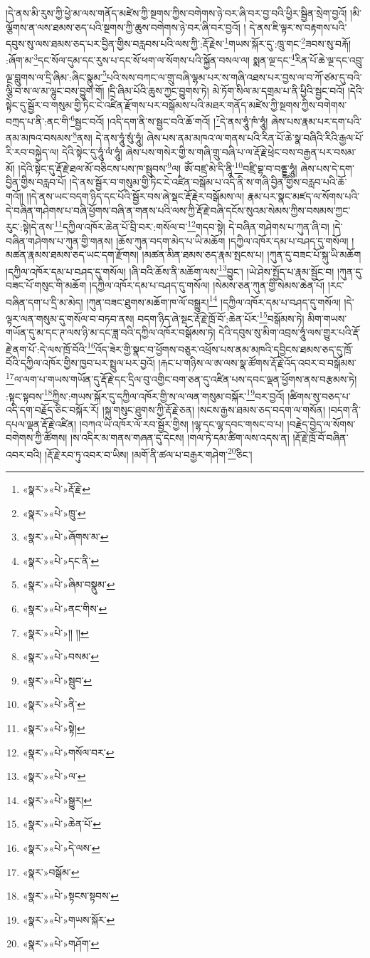 །དེ་ནས་མི་རུས་ཀྱི་ཕྱེ་མ་ལས་གནོད་མཛེས་ཀྱི་སྔགས་ཀྱིས་བགེགས་ཉེ་བར་ཞི་བར་བྱ་བའི་ཕྱིར་སྦྱིན་སྲེག་བྱའོ། །མི་ལྕོགས་ན་ལས་ཐམས་ཅད་པའི་སྔགས་ཀྱི་ཆུས་བགེགས་ཉེ་བར་ཞི་བར་བྱའོ། །
དེ་ནས་ཇི་ལྟར་ས་བརྟགས་པའི་དབུས་སུ་ལས་ཐམས་ཅད་པར་བྱིན་གྱིས་བརླབས་པའི་ལས་ཀྱི་:རྡོ་རྗེས་\footnote{«སྣར་»«པེ་»རྡོ་རྗེ་}གཡས་སྐོར་དུ་:ཁྲུ་གང་\footnote{«སྣར་»«པེ་»ཁྲུ་}ཟབས་སུ་བརྐོ། :ཞོག་མ་\footnote{«སྣར་»«པེ་»ཞོགས་མ་}དང་སོལ་དུམ་དང་རུས་པ་དང་སོ་ཕག་ལ་སོགས་པའི་སྐྱོན་བསལ་ལ། སྨན་ལྔ་དང་\footnote{«སྣར་»«པེ་»དང་ནི་}རིན་པོ་ཆེ་ལྔ་དང་འབྲུ་ལྔ་བླུགས་ལ་དྲི་ཞིམ་:ཞིང་སྣུམ་\footnote{«སྣར་»«པེ་»ཞིམ་བསྣུམ་}པའི་སས་བཀང་ལ་གྲུ་བཞི་ལྷམ་པར་ས་གཞི་འཐས་པར་བྱས་ལ་བ་ཀོ་ཙམ་དུ་བའི་ལྕི་བ་ས་ལ་མ་ལྷུང་བས་བྱུག་གོ། །དྲི་ཞིམ་པོའི་ཆུས་ཀྱང་བྱུགས་ཏེ། མེ་ཏོག་སིལ་མ་དགྲམ་པ་ནི་ཕྱིའི་སྦྱང་བའོ། །དེའི་སྟེང་དུ་སྦྱོར་བ་གསུམ་གྱི་ཏིང་ངེ་འཛིན་རྫོགས་པར་བསྒོམས་པའི་མཐར་གནོད་མཛེས་ཀྱི་སྔགས་ཀྱིས་བགེགས་བཀྲད་པ་ནི་:ནང་གི་\footnote{«སྣར་»«པེ་»ནང་གིས་}སྦྱང་བའོ། །འདི་དག་ནི་ས་སྦྱང་བའི་ཆོ་གའོ། །\footnote{«སྣར་»«པེ་»།། །།}དེ་ནས་ཧཱུཾ་ཁཾ་ཧཱུཾ། ཞེས་པས་རྣམ་པར་དག་པའི་ནམ་མཁའ་བསམས་\footnote{«སྣར་»«པེ་»བསམ་}ནས། དེ་ནས་ཧཱུཾ་སུཾ་ཧཱུཾ། ཞེས་པས་ནམ་མཁའ་ལ་གནས་པའི་རིན་པོ་ཆེ་སྣ་བཞིའི་རིའི་རྒྱལ་པོ་རི་རབ་བསྐྱེད་ལ། དེའི་སྟེང་དུ་ཧཱུཾ་ལཾ་ཧཱུཾ། ཞེས་པས་གསེར་གྱི་ས་གཞི་གྲུ་བཞི་པ་ལ་རྡོ་རྗེ་ཕྲེང་བས་བརྒྱན་པར་བསམ་མོ། །དེའི་སྟེང་དུ་རྡོ་རྗེ་ཐལ་མོ་བཅིངས་པས་ཁ་སྦུབས་\footnote{«སྣར་»«པེ་»སྦུབ་}ལ། ཨོཾ་བཛྲ་མེ་དི་ནཱི་\footnote{«སྣར་»«པེ་»ནི་}བཛྲི་བྷ་བ་བནྡྷ་ཧཱུཾ། ཞེས་པས་དེ་དག་བྱིན་གྱིས་བརླབ་པོ། །དེ་ནས་སྦྱོར་བ་གསུམ་གྱི་ཏིང་ངེ་འཛིན་བསྒོམ་པ་འདི་ནི་ས་གཞི་བྱིན་གྱིས་བརླབ་པའི་ཆོ་གའོ།། །།དེ་ནས་ཡང་བདག་ཉིད་དང་པོའི་སྦྱོར་བས་ཞེ་སྡང་རྡོ་རྗེར་བསྒོམས་ལ། རྣམ་པར་སྣང་མཛད་ལ་སོགས་པའི་དེ་བཞིན་གཤེགས་པ་བཞི་ཕྱོགས་བཞི་ན་གནས་པའི་ལས་ཀྱི་རྡོ་རྗེ་བཞི་དངོས་སུའམ་སེམས་ཀྱིས་བསམས་ཀྱང་རུང་:སྟེ།དེ་ནས་\footnote{«སྣར་»«པེ་»སྟེ།}དཀྱིལ་འཁོར་ཆེན་པོ་བྲི་བར་:གསོལ་བ་\footnote{«སྣར་»«པེ་»གསོལ་བར་}གདབ་སྟེ། དེ་བཞིན་གཤེགས་པ་ཀུན་ཞི་བ། །དེ་བཞིན་གཤེགས་པ་ཀུན་གྱི་གནས། །ཆོས་ཀུན་བདག་མེད་པ་ཡི་མཆོག །དཀྱིལ་འཁོར་དམ་པ་བཤད་དུ་གསོལ། །མཚན་རྣམས་ཐམས་ཅད་ཡང་དག་རྫོགས། །མཚན་མིན་ཐམས་ཅད་རྣམ་སྤངས་པ། །ཀུན་དུ་བཟང་པོ་སྐུ་ཡི་མཆོག །དཀྱིལ་འཁོར་དམ་པ་བཤད་དུ་གསོལ། །ཞི་བའི་ཆོས་ནི་མཆོག་ལས་\footnote{«སྣར་»«པེ་»ལ་}བྱུང་། །ཡེ་ཤེས་སྤྱོད་པ་རྣམ་སྦྱོང་བ། །ཀུན་དུ་བཟང་པོ་གསུང་གི་མཆོག །དཀྱིལ་འཁོར་དམ་པ་བཤད་དུ་གསོལ། །སེམས་ཅན་ཀུན་གྱི་སེམས་ཆེན་པོ། །རང་བཞིན་དག་པ་དྲི་མ་མེད། །ཀུན་བཟང་ཐུགས་མཆོག་ཁ་ལོ་བསྒྱུར།\footnote{«སྣར་»«པེ་»སྒྱུར།} །དཀྱིལ་འཁོར་དམ་པ་བཤད་དུ་གསོལ། །དེ་ལྟར་ལན་གསུམ་དུ་གསོལ་བ་བཏབ་ནས། བདག་ཉིད་ཞེ་སྡང་རྡོ་རྗེ་ཁྲོ་བོ་:ཆེན་པོར་\footnote{«སྣར་»«པེ་»ཆེན་པོ་}བསྒོམས་ཏེ། མིག་གཡས་གཡོན་དུ་མ་དང་ཊ་ལས་ཉི་མ་དང་ཟླ་བའི་དཀྱིལ་འཁོར་བསྒོམས་ཏེ། དེའི་དབུས་སུ་མིག་འབྲས་ཧཱུཾ་ལས་གྱུར་པའི་རྡོ་རྗེ་ནག་པོ་:དེ་ལས་ཁྲོ་བོའི་\footnote{«སྣར་»«པེ་»དེ་ལས་}འོད་ཟེར་གྱི་སྣང་བ་ཕྱོགས་བཅུར་འཕྲོས་པས་ནམ་མཁའི་དབྱིངས་ཐམས་ཅད་དུ་ཁྲོ་བོའི་དཀྱིལ་འཁོར་གྱིས་ཁྱབ་པར་སྤྲུལ་པར་བྱའོ། །རྐང་པ་གཉིས་ལ་ཨ་ལས་སྣ་ཚོགས་རྡོ་རྗེ་འོད་འབར་བ་བསྒོམས་\footnote{«སྣར་»བསྒོམ་}ལ་ལག་པ་གཡས་གཡོན་དུ་རྡོ་རྗེ་དང་དྲིལ་བུ་འགྱིང་བག་ཅན་དུ་འཛིན་པས་དབང་ལྡན་ཕྱོགས་ནས་བརྩམས་ཏེ། :སྟང་སྟབས་\footnote{«སྣར་»«པེ་»སྟངས་སྟབས་}ཀྱིས་:གཡས་སྐོར་དུ་དཀྱིལ་འཁོར་གྱི་ས་ལ་ལན་གསུམ་བསྐོར་\footnote{«སྣར་»«པེ་»གཡས་སྐོར་}བར་བྱའོ། །ཚིགས་སུ་བཅད་པ་འདི་དག་བརྗོད་ཅིང་བསྐོར་རོ། །སྐུ་གསུང་ཐུགས་ཀྱི་རྡོ་རྗེ་ཅན། །སངས་རྒྱས་ཐམས་ཅད་བདག་ལ་གསོན། །བདག་ནི་དཔལ་ལྡན་རྡོ་རྗེ་འཛིན། །བཀའ་ཡི་འཁོར་ལོ་རབ་སྦྱོར་གྱིས། །ལྷ་དང་ལྷ་དབང་གསང་བ་པ། །བརྗེད་བྱེད་ལ་སོགས་བགེགས་ཀྱི་ཚོགས། །ས་འདིར་མ་གནས་གཞན་དུ་དེངས། །གལ་ཏེ་དམ་ཚིག་ལས་འདས་ན། །རྡོ་རྗེ་ཁྲོ་བོ་བཞིན་འབར་བའི། །རྡོ་རྗེ་རབ་ཏུ་འབར་བ་ཡིས། །མགོ་ནི་ཚལ་པ་བརྒྱར་གཤེག་\footnote{«སྣར་»«པེ་»གཤོག་}ཅིང་། 
